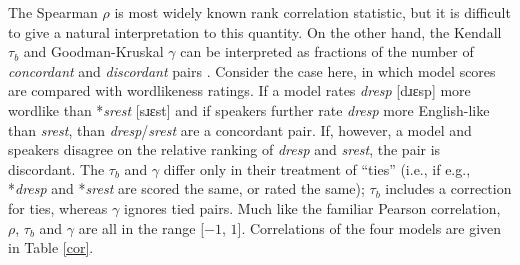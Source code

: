 The Spearman $\rho$ is most widely known rank correlation statistic, but it is difficult to give a natural interpretation to this quantity. On the other hand, the Kendall $\tau_b$ and Goodman-Kruskal $\gamma$ can be interpreted as fractions of the number of \emph{concordant} and \emph{discordant} pairs \citep{Noether1981}. Consider the case here, in which model scores are compared with wordlikeness ratings. If a model rates \emph{dresp} [dɹɛsp] more wordlike than *\emph{srest} [sɹɛst] and if speakers further rate \emph{dresp} more English-like than \emph{srest}, than \emph{dresp}/\emph{srest} are a concordant pair. If, however, a model and speakers disagree on the relative ranking of \emph{dresp} and \emph{srest}, the pair is discordant. The $\tau_b$ and $\gamma$ differ only in their treatment of ``ties'' (i.e., if e.g., *\emph{dresp} and *\emph{srest} are scored the same, or rated the same); $\tau_b$ includes a correction for ties, whereas $\gamma$ ignores tied pairs. Much like the familiar Pearson correlation, $\rho$, $\tau_b$ and $\gamma$ are all in the range [$-1$, $1$]. Correlations of the four models are given in Table \ref{cor}.

